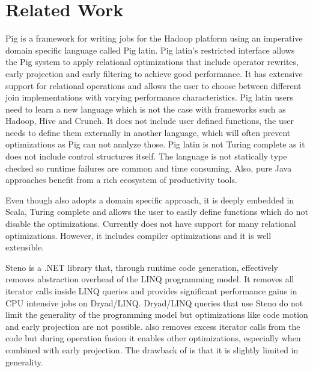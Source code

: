 \section{Related Work}
\label{sec:related-work}

Pig \cite{olston_pig_2008-1} is a framework for writing jobs for the Hadoop platform using an imperative domain specific language called Pig latin. Pig latin's restricted interface allows the Pig system to apply relational optimizations that include operator rewrites, early projection and early filtering to achieve good performance. 
It has extensive support for relational operations and allows the user to choose between different join implementations with varying performance characteristics. Pig latin users need to learn a new language which is not the case with frameworks such as Hadoop, Hive and Crunch. It does not include user defined functions, the user needs to define them externally in another language, which will often prevent optimizations as Pig can not analyze those. Pig latin is not Turing complete as it does not include control structures itself.
The language is not statically type checked so runtime failures are common and time consuming. Also, pure Java approaches benefit from a rich ecosystem of productivity tools. 

Even though \tool also adopts a domain specific approach, it is deeply embedded in Scala, Turing complete and allows the user to easily define functions which do not disable the optimizations. Currently \tool does not have support for many relational optimizations. However, it includes compiler optimizations and it is well extensible.

Steno \cite{murray_steno:_2011} is a .NET library that, through runtime code generation, effectively removes abstraction overhead of the LINQ programming model. It removes all iterator calls inside LINQ queries and provides significant performance gains in CPU intensive jobs on Dryad/LINQ. Dryad/LINQ queries that use Steno do not limit the generality of the programming model but optimizations like code motion and early projection are not possible. 
\tool also removes excess iterator calls from the code but during operation fusion it enables other optimizations, especially when combined with early projection. The drawback of \tool is that it is slightly limited in generality.

